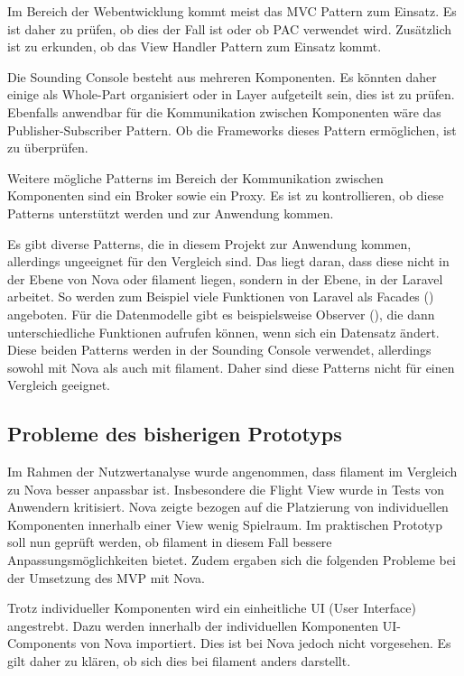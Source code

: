 Im Bereich der Webentwicklung kommt meist das MVC Pattern zum Einsatz.
Es ist daher zu prüfen, ob dies der Fall ist oder ob PAC verwendet wird.
Zusätzlich ist zu erkunden, ob das View Handler Pattern zum Einsatz kommt.

Die Sounding Console besteht aus mehreren Komponenten.
Es könnten daher einige als Whole-Part organisiert oder in Layer aufgeteilt sein, dies ist zu prüfen.
Ebenfalls anwendbar für die Kommunikation zwischen Komponenten wäre das Publisher-Subscriber Pattern.
Ob die Frameworks dieses Pattern ermöglichen, ist zu überprüfen.

Weitere mögliche Patterns im Bereich der Kommunikation zwischen Komponenten sind ein Broker sowie ein Proxy.
Es ist zu kontrollieren, ob diese Patterns unterstützt werden und zur Anwendung kommen.

Es gibt diverse Patterns, die in diesem Projekt zur Anwendung kommen, allerdings ungeeignet für den Vergleich sind.
Das liegt daran, dass diese nicht in der Ebene von Nova oder filament liegen, sondern in der Ebene, in der Laravel arbeitet.
So werden zum Beispiel viele Funktionen von Laravel als Facades (\cite{gamma-design-patterns}) angeboten.
Für die Datenmodelle gibt es beispielsweise Observer (\cite{gamma-design-patterns}), die dann unterschiedliche Funktionen aufrufen können, wenn sich ein Datensatz ändert.
Diese beiden Patterns werden in der Sounding Console verwendet, allerdings sowohl mit Nova als auch mit filament.
Daher sind diese Patterns nicht für einen Vergleich geeignet.

\newpage

\subsection{Probleme des bisherigen Prototyps}
Im Rahmen der Nutzwertanalyse wurde angenommen, dass filament im Vergleich zu Nova besser anpassbar ist.
Insbesondere die Flight View wurde in Tests von Anwendern kritisiert.
Nova zeigte bezogen auf die Platzierung von individuellen Komponenten innerhalb einer View wenig Spielraum.
Im praktischen Prototyp soll nun geprüft werden, ob filament in diesem Fall bessere Anpassungsmöglichkeiten bietet.
Zudem ergaben sich die folgenden Probleme bei der Umsetzung des MVP mit Nova.

Trotz individueller Komponenten wird ein einheitliche UI (User Interface) angestrebt.
Dazu werden innerhalb der individuellen Komponenten UI-Components von Nova importiert.
Dies ist bei Nova jedoch nicht vorgesehen.
Es gilt daher zu klären, ob sich dies bei filament anders darstellt.

